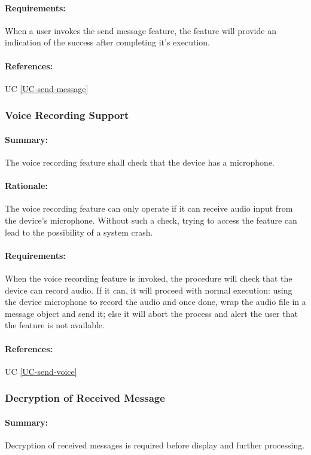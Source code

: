 \documentclass[11pt]{article}
\begin{document}
\paragraph{Requirements:} When a user invokes the send message feature, the feature will provide an indication of the success after completing it's execution.
\paragraph{References:} UC \ref{UC-send-message}

\subsubsection{Voice Recording Support} \label{FR-voice-record-support}
\paragraph{Summary:} The voice recording feature shall check that the device has a microphone.
\paragraph{Rationale:} The voice recording feature can only operate if it can receive audio input from the device's microphone. Without such a check, trying to access the feature can lead to the possibility of a system crash.
\paragraph{Requirements:} When the voice recording feature is invoked, the procedure will check that the device can record audio. If it can, it will proceed with normal execution: using the device microphone to record the audio and once done, wrap the audio file in a message object and send it; else it will abort the process and alert the user that the feature is not available.
\paragraph{References:} UC \ref{UC-send-voice}

\subsubsection{Decryption of Received Message} \label{FR-decrypt-received-message}
\paragraph{Summary:} Decryption of received messages is required before display and further processing.
\end{document}
